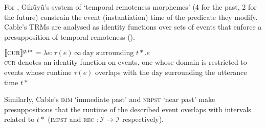 \documentclass[11pt,dvipsnames]{report}
\providecommand{\denote}[2][]{\ensuremath{\llbracket{#2}\rrbracket^{#1}}}
\begin{document}
For \cite{Cable2013}, Gikũyũ's system of `temporal remoteness morphemes' (4 for the past, 2 for the future) constrain the event (instantiation) time of the predicate they modify. Cable's TRMs are analysed as identity functions over sets of events that enforce a presupposition of temporal remoteness (\nextx).

\pex\denote[g,t*]{\textsc{cur}}$ =\lambda e:\tau(e)\,\infty\,\text{day surrounding }t*.e $\\
\textsc{cur} denotes an identity function on events, one whose domain is restricted to events whose runtime $ \tau(e) $ overlaps with the day surrounding the utterance time $ t* $
\xe

Similarly, Cable's \textsc{imm} `immediate past' and \textsc{nrpst} `near past' make presuppositions that the runtime of the described event overlaps with intervals related to $ t* $ (\textsc{impst} and \textsc{rec} $ :\mathcal I\to\mathcal I $ respectively).
\end{document}
